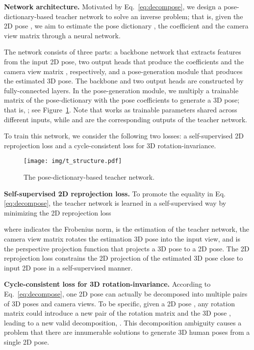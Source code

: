 \documentclass[letterpaper]{article} \usepackage{aaai21}  \usepackage{times}  \usepackage{helvet} \usepackage{courier}  \usepackage[hyphens]{url}  \usepackage{graphicx} \urlstyle{rm} \def\UrlFont{\rm}  \usepackage{natbib}  \usepackage{caption} \frenchspacing  \setlength{\pdfpagewidth}{8.5in}  \setlength{\pdfpageheight}{11in}
\begin{document}
\textbf{Network architecture.}
Motivated by Eq.~\eqref{eq:decompose}, we design a pose-dictionary-based teacher network to solve an inverse problem; that is, given the 2D pose , we aim to estimate the pose dictionary , the coefficient  and the camera view matrix  through a neural network.  

The network consists of three parts: a backbone network that extracts features from the input 2D pose, two output heads that produce the coefficients  and the camera view matrix , respectively, and a pose-generation module that produces the estimated 3D pose. The backbone and two output heads are constructed by fully-connected layers. In the pose-generation module, we multiply a trainable matrix of the pose-dictionary  with the pose coefficients  to generate a 3D pose; that is, ; see Figure~\ref{fig:teacher}. Note that  works as trainable parameters shared across different inputs, while  and  are the corresponding outputs of the teacher network.

To train this network, we consider the following two losses: a self-supervised 2D reprojection loss and a cycle-consistent loss for 3D rotation-invariance.

\begin{figure}[t] 
\centering
\texttt{[image: img/t\_structure.pdf]} 
\vspace{-2mm}
\caption{\small The pose-dictionary-based teacher network.} 
\label{fig:teacher}
\vspace{-5mm}
\end{figure}

\textbf{Self-supervised 2D reprojection loss.} To promote the equality in Eq.\eqref{eq:decompose}, the teacher network is learned in a self-supervised way by minimizing the 2D reprojection loss

where  indicates the Frobenius norm,  is the estimation of the teacher network, the camera view matrix  rotates the estimation 3D pose into the input view, and  is the perspective projection function that projects a 3D pose to a 2D pose. The 2D reprojection loss constrains the 2D projection of the estimated 3D pose close to input 2D pose in a self-supervised manner.

\textbf{Cycle-consistent loss for 3D rotation-invariance.}
According to Eq.~\eqref{eq:decompose}, one 2D pose can actually be decomposed into multiple pairs of 3D poses and camera views. To be specific, given a 2D pose , any rotation matrix  could introduce a new pair of the rotation matrix  and the 3D pose , leading to a new valid decomposition, . This decomposition ambiguity causes a problem that there are innumerable solutions to generate 3D human poses from a single 2D pose.
\end{document}

